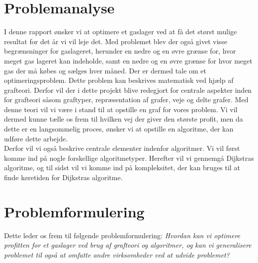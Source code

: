 \section{Problemanalyse}
I denne rapport ønsker vi at optimere et gaslager ved at få det størst mulige resultat for det år vi vil leje det. Med problemet blev der også givet visse begrænsninger for gaslageret, herunder en nedre og en øvre grænse for, hvor meget gas lageret kan indeholde, samt en nedre og en øvre grænse for hvor meget gas der må købes og sælges hver måned. Der er dermed tale om et optimeringsproblem. Dette problem kan beskrives matematisk ved hjælp af grafteori. Derfor vil der i dette projekt blive redegjort for centrale aspekter inden for grafteori såsom
graftyper, repræsentation af grafer, veje og delte grafer. Med denne teori vil vi være i stand til at opstille en graf for vores problem. Vi vil dermed kunne tælle os frem til hvilken vej der giver den største profit, men da dette er en langsommelig proces, ønsker vi at opstille en algoritme, der kan udføre dette arbejde. \\ Derfor vil vi også beskrive centrale elementer indenfor algoritmer. Vi vil først komme ind på nogle forskellige algoritmetyper. Herefter vil vi gennemgå Dijkstras algoritme, og til sidst vil vi komme ind på kompleksitet, der kan bruges til at finde køretiden for Dijkstras algoritme.

\section{Problemformulering}
Dette leder os frem til følgende problemformulering:
\textit{Hvordan kan vi optimere profitten for et gaslager ved brug af grafteori og algoritmer, og kan vi generalisere problemet til også at omfatte andre virksomheder ved at udvide problemet?}


